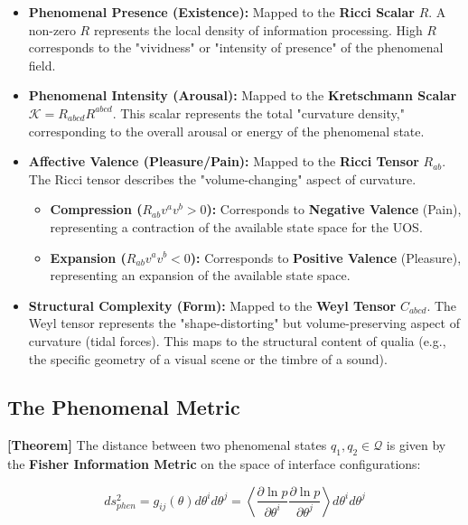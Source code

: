 \documentclass[11pt,titlepage]{article}
\newcommand{\tagtheo}{\textcolor{green!60!black}{\textbf{[Theorem]}} }
\begin{document}
\begin{itemize}
    
\item \textbf{Phenomenal Presence (Existence):} Mapped to the \textbf{Ricci Scalar} $R$. A non-zero $R$ represents the local density of information processing. High $R$ corresponds to the "vividness" or "intensity of presence" of the phenomenal field.
    
    
\item \textbf{Phenomenal Intensity (Arousal):} Mapped to the \textbf{Kretschmann Scalar} $\mathcal{K} = R_{abcd}R^{abcd}$. This scalar represents the total "curvature density," corresponding to the overall arousal or energy of the phenomenal state.
    
    
\item \textbf{Affective Valence (Pleasure/Pain):} Mapped to the \textbf{Ricci Tensor} $R_{ab}$. The Ricci tensor describes the "volume-changing" aspect of curvature.
    \begin{itemize}
        
\item \textbf{Compression ($R_{ab} v^a v^b > 0$):} Corresponds to \textbf{Negative Valence} (Pain), representing a contraction of the available state space for the UOS.
        
\item \textbf{Expansion ($R_{ab} v^a v^b < 0$):} Corresponds to \textbf{Positive Valence} (Pleasure), representing an expansion of the available state space.
    \end{itemize}
    
    
\item \textbf{Structural Complexity (Form):} Mapped to the \textbf{Weyl Tensor} $C_{abcd}$. The Weyl tensor represents the "shape-distorting" but volume-preserving aspect of curvature (tidal forces). This maps to the structural content of qualia (e.g., the specific geometry of a visual scene or the timbre of a sound).
\end{itemize}

\subsection{The Phenomenal Metric}
\tagtheo The distance between two phenomenal states $q_1, q_2 \in \mathcal{Q}$ is given by the \textbf{Fisher Information Metric} on the space of interface configurations:

\begin{equation}
ds^2_{phen} = g_{ij}(\theta) d\theta^i d\theta^j = \left\langle \frac{\partial \ln p}{\partial \theta^i} \frac{\partial \ln p}{\partial \theta^j} \right\rangle d\theta^i d\theta^j
\end{equation}
\end{document}
